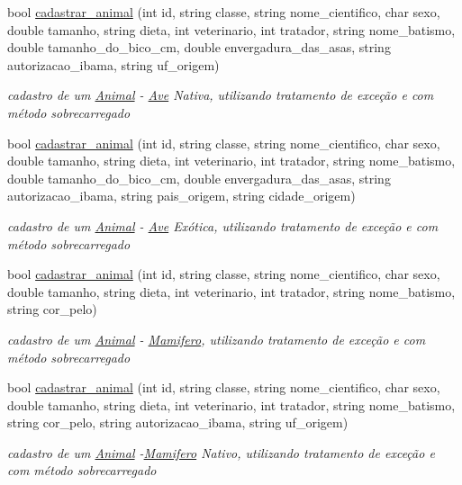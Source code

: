 \begin{DoxyCompactItemize}
bool \mbox{\hyperlink{class_sistema_aaa33ed8820b6a9f9c14f3f4f5ab2df4e}{cadastrar\+\_\+animal}} (int id, string classe, string nome\+\_\+cientifico, char sexo, double tamanho, string dieta, int veterinario, int tratador, string nome\+\_\+batismo, double tamanho\+\_\+do\+\_\+bico\+\_\+cm, double envergadura\+\_\+das\+\_\+asas, string autorizacao\+\_\+ibama, string uf\+\_\+origem)
\begin{DoxyCompactList}\small\item\em cadastro de um \mbox{\hyperlink{class_animal}{Animal}} -\/ \mbox{\hyperlink{class_ave}{Ave}} Nativa, utilizando tratamento de exceção e com método sobrecarregado \end{DoxyCompactList}\item 
bool \mbox{\hyperlink{class_sistema_af360ec77152a6b60c5cfe4a4a31deeb6}{cadastrar\+\_\+animal}} (int id, string classe, string nome\+\_\+cientifico, char sexo, double tamanho, string dieta, int veterinario, int tratador, string nome\+\_\+batismo, double tamanho\+\_\+do\+\_\+bico\+\_\+cm, double envergadura\+\_\+das\+\_\+asas, string autorizacao\+\_\+ibama, string pais\+\_\+origem, string cidade\+\_\+origem)
\begin{DoxyCompactList}\small\item\em cadastro de um \mbox{\hyperlink{class_animal}{Animal}} -\/ \mbox{\hyperlink{class_ave}{Ave}} Exótica, utilizando tratamento de exceção e com método sobrecarregado \end{DoxyCompactList}\item 
bool \mbox{\hyperlink{class_sistema_a5b55e20b1440ad96bf7182a679d5f0fe}{cadastrar\+\_\+animal}} (int id, string classe, string nome\+\_\+cientifico, char sexo, double tamanho, string dieta, int veterinario, int tratador, string nome\+\_\+batismo, string cor\+\_\+pelo)
\begin{DoxyCompactList}\small\item\em cadastro de um \mbox{\hyperlink{class_animal}{Animal}} -\/ \mbox{\hyperlink{class_mamifero}{Mamifero}}, utilizando tratamento de exceção e com método sobrecarregado \end{DoxyCompactList}\item 
bool \mbox{\hyperlink{class_sistema_a8a8ffc01c3b3a69f08cfb7224c2705c3}{cadastrar\+\_\+animal}} (int id, string classe, string nome\+\_\+cientifico, char sexo, double tamanho, string dieta, int veterinario, int tratador, string nome\+\_\+batismo, string cor\+\_\+pelo, string autorizacao\+\_\+ibama, string uf\+\_\+origem)
\begin{DoxyCompactList}\small\item\em cadastro de um \mbox{\hyperlink{class_animal}{Animal}} -\/\mbox{\hyperlink{class_mamifero}{Mamifero}} Nativo, utilizando tratamento de exceção e com método sobrecarregado \end{DoxyCompactList}\item 

\end{DoxyCompactItemize}
